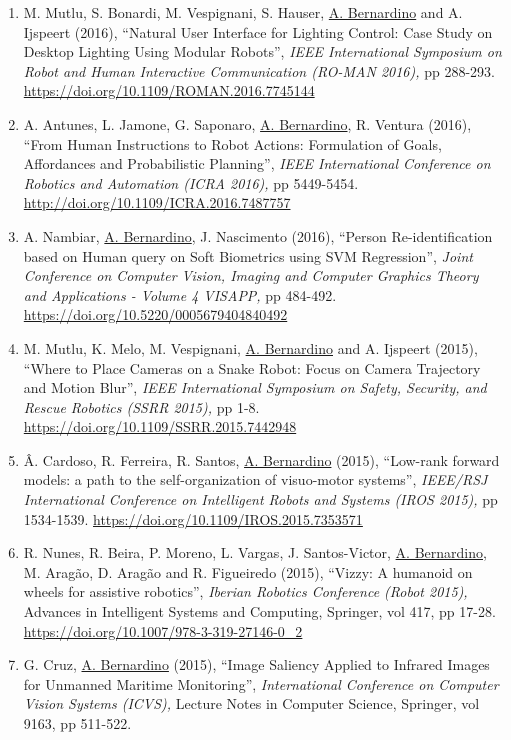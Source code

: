 \begin{enumerate}
  \url{https://doi.org/10.1109/OCEANS.2016.7761019}~
\item
  M. Mutlu, S. Bonardi, M. Vespignani, S. Hauser, \ul{A. Bernardino} and
  A. Ijspeert (2016), ``Natural User Interface for Lighting Control:
  Case Study on Desktop Lighting Using Modular Robots'', \emph{IEEE
  International Symposium on Robot and Human Interactive Communication
  (RO-MAN 2016),} pp 288-293.
  \url{https://doi.org/10.1109/ROMAN.2016.7745144}~
\item
  A. Antunes, L. Jamone, G. Saponaro, \ul{A. Bernardino}, R. Ventura
  (2016), ``From Human Instructions to Robot Actions: Formulation of
  Goals, Affordances and Probabilistic Planning'', \emph{IEEE
  International Conference on Robotics and Automation (ICRA 2016),} pp
  5449-5454. \url{http://doi.org/10.1109/ICRA.2016.7487757}~
\item
  A. Nambiar, \ul{A. Bernardino}, J. Nascimento (2016), ``Person
  Re-identification based on Human query on Soft Biometrics using SVM
  Regression'', \emph{Joint Conference on Computer Vision, Imaging and
  Computer Graphics Theory and Applications - Volume 4 VISAPP,} pp
  484-492. \url{https://doi.org/10.5220/0005679404840492}~
\item
  M. Mutlu, K. Melo, M. Vespignani, \ul{A. Bernardino} and A. Ijspeert
  (2015), ``Where to Place Cameras on a Snake Robot: Focus on Camera
  Trajectory and Motion Blur'', \emph{IEEE International Symposium on
  Safety, Security, and Rescue Robotics (SSRR 2015),} pp 1-8.
  \url{https://doi.org/10.1109/SSRR.2015.7442948}~
\item
  Â. Cardoso, R. Ferreira, R. Santos, \ul{A. Bernardino} (2015),
  ``Low-rank forward models: a path to the self-organization of
  visuo-motor systems'', \emph{IEEE/RSJ International Conference on
  Intelligent Robots and Systems (IROS 2015),} pp 1534-1539.
  \url{https://doi.org/10.1109/IROS.2015.7353571}~
\item
  R. Nunes, R. Beira, P. Moreno, L. Vargas, J. Santos-Victor, \ul{A.
  Bernardino}, M. Aragão, D. Aragão and R. Figueiredo (2015), ``Vizzy: A
  humanoid on wheels for assistive robotics'', \emph{Iberian Robotics
  Conference (Robot 2015),} Advances in Intelligent Systems and
  Computing, Springer, vol 417, pp 17-28.
  \url{https://doi.org/10.1007/978-3-319-27146-0_2}~
\item
  G. Cruz, \ul{A. Bernardino} (2015), ``Image Saliency Applied to
  Infrared Images for Unmanned Maritime Monitoring'',
  \emph{International Conference on Computer Vision Systems (ICVS),}
  Lecture Notes in Computer Science, Springer, vol 9163, pp 511-522.

\end{enumerate}
